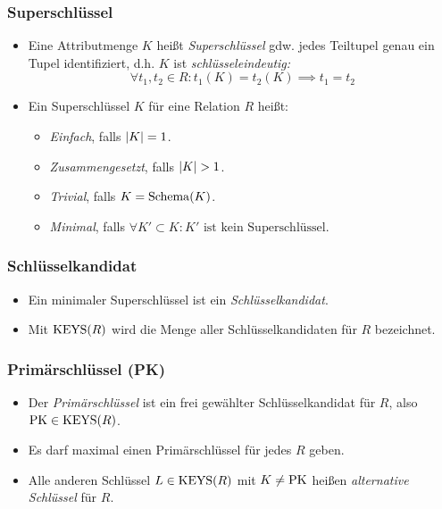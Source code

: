 			\subsubsection{Superschlüssel} %
				\begin{itemize}
					\item Eine Attributmenge \(K\) heißt \textit{Superschlüssel} gdw. jedes Teiltupel genau ein Tupel identifiziert, d.h. \(K\) ist \textit{schlüsseleindeutig:}
						\begin{equation*}
							\forall t_1, t_2 \in R : t_1(K) = t_2(K) \implies t_1 = t_2
						\end{equation*}
					\item Ein Superschlüssel \(K\) für eine Relation \(R\) heißt:
						\begin{itemize}
							\item \textit{Einfach}, falls \( \abs{K} = 1 \).
							\item \textit{Zusammengesetzt}, falls \( \abs{K} > 1 \).
							\item \textit{Trivial}, falls \(K = \operatorname{Schema}(K)\).
							\item \textit{Minimal}, falls \( \forall K' \subset K : K' \text{ ist kein Superschlüssel} \).
						\end{itemize}
				\end{itemize}

			\subsubsection{Schlüsselkandidat} %
				\begin{itemize}
					\item Ein minimaler Superschlüssel ist ein \textit{Schlüsselkandidat}.
					\item Mit \( \operatorname{KEYS}(R) \) wird die Menge aller Schlüsselkandidaten für \(R\) bezeichnet.
				\end{itemize}

			\subsubsection{Primärschlüssel (PK)} %
				\begin{itemize}
					\item Der \textit{Primärschlüssel} ist ein frei gewählter Schlüsselkandidat für \(R\), also \( \operatorname{PK} \in \operatorname{KEYS}(R) \).
					\item Es darf maximal einen Primärschlüssel für jedes \(R\) geben.
					\item Alle anderen Schlüssel \( L \in \operatorname{KEYS}(R) \) mit \( K \neq \operatorname{PK} \) heißen \textit{alternative Schlüssel} für \(R\).
				\end{itemize}

